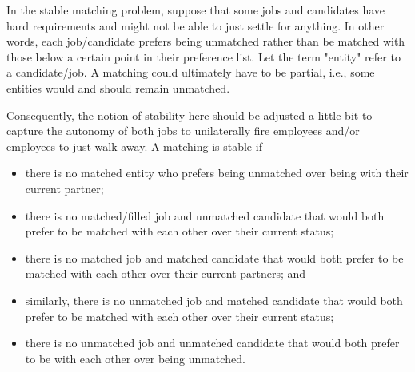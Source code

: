 \documentclass[11pt]{article}
\begin{document}
In the stable matching problem, suppose that some jobs and candidates
have hard requirements and might not be able to just settle for
anything.  In other words, each job/candidate prefers being unmatched
rather than be matched with those below a certain point in their
preference list. Let the term "entity" refer to a candidate/job.  A
matching could ultimately have to be partial, i.e., some entities
would and should remain unmatched.

Consequently, the notion of stability here should be adjusted a little bit to
capture the autonomy of both jobs to unilaterally fire employees and/or
employees to just walk away. A matching is stable if
\begin{itemize}
\item there is no matched entity who prefers being unmatched over being with their current partner;
\item there is no matched/filled job and unmatched candidate that
  would both prefer to be matched with each other over their current
  status;
\item there is no matched job and matched candidate that would both
  prefer to be matched with each other over their current partners; and
\item similarly, there is no unmatched job and matched candidate that
  would both prefer to be matched with each other over their current status;
\item there is no unmatched job and unmatched candidate that would
  both prefer to be with each other over being unmatched.
\end{itemize}
\end{document}

